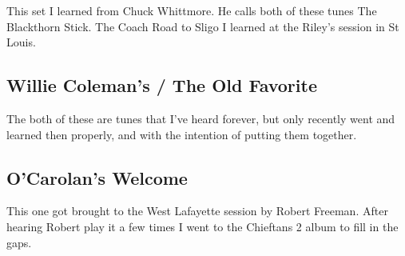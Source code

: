 \documentclass[11pt,letterpaper]{article}
\begin{document}
This set I learned from Chuck Whittmore. He calls both of these tunes The Blackthorn Stick. The Coach Road to Sligo I learned at the Riley's session in St Louis. 

\subsection{Willie Coleman's / The Old Favorite}

The  both of these are tunes that I've heard forever, but only recently went and learned then properly, and with the intention of putting them together.

\subsection{O'Carolan's Welcome}

This one got brought to the West Lafayette session by Robert Freeman. After hearing Robert play it a few times I went to the Chieftans 2 album to fill in the gaps. 
\end{document}
